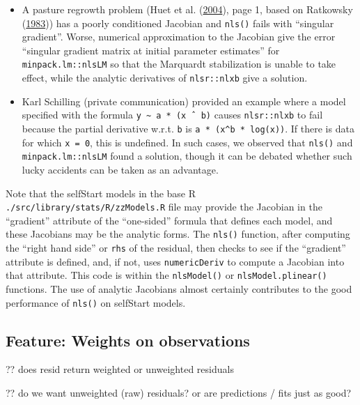 \documentclass[
]{article}
\begin{document}
\begin{itemize}
\item
  A pasture regrowth problem (Huet et al.
  (\protect\hyperlink{ref-Huet2004}{2004}), page 1, based on Ratkowsky
  (\protect\hyperlink{ref-Ratkowsky1983}{1983})) has a poorly
  conditioned Jacobian and \texttt{nls()} fails with ``singular
  gradient''. Worse, numerical approximation to the Jacobian give the
  error ``singular gradient matrix at initial parameter estimates'' for
  \texttt{minpack.lm::nlsLM} so that the Marquardt stabilization is
  unable to take effect, while the analytic derivatives of
  \texttt{nlsr::nlxb} give a solution.
\item
  Karl Schilling (private communication) provided an example where a
  model specified with the formula
  \texttt{y\ \textasciitilde{}\ a\ *\ (x\ ˆ\ b)} causes
  \texttt{nlsr::nlxb} to fail because the partial derivative w.r.t.
  \texttt{b} is \texttt{a\ *\ (x\^{}b\ *\ log(x))}. If there is data for
  which \texttt{x\ =\ 0}, this is undefined. In such cases, we observed
  that \texttt{nls()} and \texttt{minpack.lm::nlsLM} found a solution,
  though it can be debated whether such lucky accidents can be taken as
  an advantage.
\end{itemize}

Note that the selfStart models in the base R
\texttt{./src/library/stats/R/zzModels.R} file may provide the Jacobian
in the ``gradient'' attribute of the ``one-sided'' formula that defines
each model, and these Jacobians may be the analytic forms. The
\texttt{nls()} function, after computing the ``right hand side'' or
\texttt{rhs} of the residual, then checks to see if the ``gradient''
attribute is defined, and, if not, uses \texttt{numericDeriv} to compute
a Jacobian into that attribute. This code is within the
\texttt{nlsModel()} or \texttt{nlsModel.plinear()} functions. The use of
analytic Jacobians almost certainly contributes to the good performance
of \texttt{nls()} on selfStart models.

\hypertarget{feature-weights-on-observations}{%
\subsection{Feature: Weights on
observations}\label{feature-weights-on-observations}}

?? does resid return weighted or unweighted residuals

?? do we want unweighted (raw) residuals? or are predictions / fits just
as good?
\end{document}
